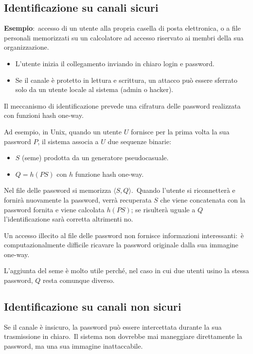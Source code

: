 \subsection{Identificazione su canali sicuri}

\textbf{Esempio}:\ accesso di un utente alla propria casella di posta elettronica, o a file personali memorizzati su un calcolatore ad accesso riservato ai membri della sua organizzazione.\
\begin{itemize}
    \item L'utente inizia il collegamento inviando in chiaro login e password.\
    \item Se il canale è protetto in lettura e scrittura, un attacco può essere sferrato solo da un utente locale al sistema (admin o hacker).\
\end{itemize}

\noindent Il meccanismo di identificazione prevede una cifratura delle password realizzata con funzioni hash one-way.\

Ad esempio, in Unix, quando un utente $U$ fornisce per la prima volta la sua password $P$, il sistema associa a $U$ due sequenze binarie:\
\begin{itemize}
    \item $S$ (seme) prodotta da un generatore pseudocasuale.
    \item $Q = h(PS)$ con $h$ funzione hash one-way.
\end{itemize}

\noindent Nel file delle password si memorizza $\langle S, Q\rangle$.\
Quando l'utente si riconnetterà e fornirà nuovamente la password, verrà recuperata $S$ che viene concatenata con la password fornita e viene calcolata $h(PS)$; se risulterà uguale a $Q$ l'identificazione sarà corretta altrimenti no.\

Un accesso illecito al file delle password non fornisce informazioni interessanti:\ è computazionalmente difficile ricavare la password originale dalla sua immagine one-way.\

L'aggiunta del seme è molto utile perché, nel caso in cui due utenti usino la stessa password, $Q$ resta comunque diverso.\

\subsection{Identificazione su canali non sicuri}

Se il canale è insicuro, la password può essere intercettata durante la sua trasmissione in chiaro.\
Il sistema non dovrebbe mai maneggiare direttamente la password, ma una sua immagine inattaccabile.\

